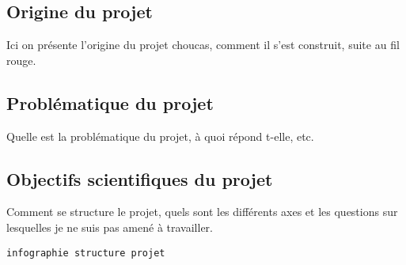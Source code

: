 \subsection{Origine du projet}
\label{subsec:1-2-1}

Ici on présente l'origine du projet choucas, comment il s'est
construit, suite au fil rouge. 

\subsection{Problématique du projet}
\label{subsec:1-2-2}

Quelle est la problématique du projet, à quoi répond t-elle, etc.

\subsection{Objectifs scientifiques du projet}
\label{subsec:1-2-3}

Comment se structure le projet, quels sont les différents axes et les
questions sur lesquelles je ne suis pas amené à travailler.

\texttt{infographie structure projet}